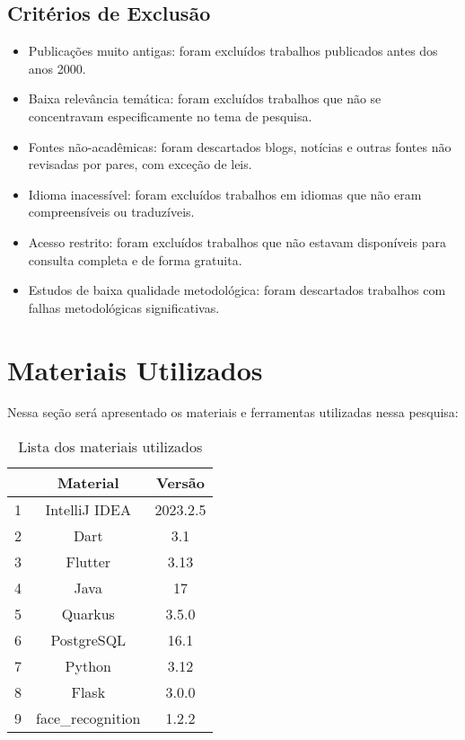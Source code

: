 \subsection{Critérios de Exclusão}\label{subsec:criterios-de-exclusao}

\begin{itemize}
    \item Publicações muito antigas: foram excluídos trabalhos publicados antes dos anos 2000.
    \item Baixa relevância temática: foram excluídos trabalhos que não se concentravam especificamente no tema de pesquisa.
    \item Fontes não-acadêmicas: foram descartados blogs, notícias e outras fontes não revisadas por pares, com exceção de leis.
    \item Idioma inacessível: foram excluídos trabalhos em idiomas que não eram compreensíveis ou traduzíveis.
    \item Acesso restrito: foram excluídos trabalhos que não estavam disponíveis para consulta completa e de forma gratuita.
    \item Estudos de baixa qualidade metodológica: foram descartados trabalhos com falhas metodológicas significativas.
\end{itemize}


\section{Materiais Utilizados}\label{sec:materiais-utilizados}
Nessa seção será apresentado os materiais e ferramentas utilizadas nessa pesquisa:

\begin{table}[H]
    \centering
    \caption{Lista dos materiais utilizados}
    \label{tab:materiais-utilizados}
    \begin{tabular}{|c|c|c|}
        \hline
        & \textbf{Material} & \textbf{Versão} \\ \hline
        1 & IntelliJ IDEA     & 2023.2.5        \\ \hline
        2 & Dart              & 3.1             \\ \hline
        3 & Flutter           & 3.13            \\ \hline
        4 & Java              & 17              \\ \hline
        5 & Quarkus           & 3.5.0           \\ \hline
        6 & PostgreSQL        & 16.1            \\ \hline
        7 & Python            & 3.12            \\ \hline
        8 & Flask             & 3.0.0           \\ \hline
        9 & face\_recognition & 1.2.2           \\ \hline
    \end{tabular}
\end{table}

